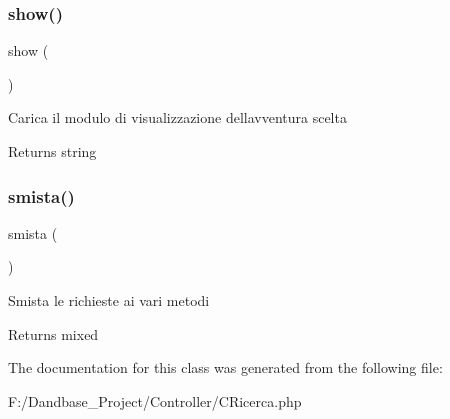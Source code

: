 \subsubsection{\texorpdfstring{show()}{show()}}
{\footnotesize\ttfamily show (\begin{DoxyParamCaption}{ }\end{DoxyParamCaption})}

Carica il modulo di visualizzazione dell\textquotesingle{}avventura scelta

\begin{DoxyReturn}{Returns}
string 
\end{DoxyReturn}
\mbox{\label{class_c_ricerca_afc7ba180569cef3535974cfc4a1211f1}} 
\subsubsection{\texorpdfstring{smista()}{smista()}}
{\footnotesize\ttfamily smista (\begin{DoxyParamCaption}{ }\end{DoxyParamCaption})}

Smista le richieste ai vari metodi

\begin{DoxyReturn}{Returns}
mixed 
\end{DoxyReturn}


The documentation for this class was generated from the following file\+:\begin{DoxyCompactItemize}
\item 
F\+:/\+Dandbase\+\_\+\+Project/\+Controller/C\+Ricerca.\+php\end{DoxyCompactItemize}
